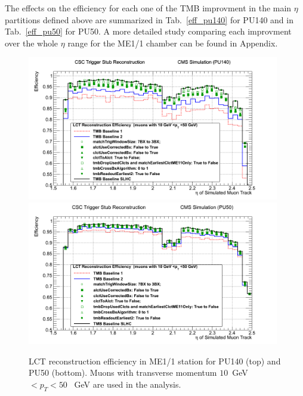 The effects on the efficiency for each one of the TMB improvment in the main $\eta$ partitions defined above are summarized in Tab.~\ref{eff_pu140} for PU140 and in Tab.~\ref{eff_pu50} for PU50. A more detailed study comparing each improvment over the whole $\eta$ range for the ME1/1 chamber can be found in Appendix.

\begin{figure}[p]
\includegraphics[width=0.98\textwidth]{figures/TMB_improvements_LCT_recoEff.png}
\includegraphics[width=0.98\textwidth]{figures/TMB_improvements_LCT_recoEff_PU50.png}
\caption{LCT reconstruction efficiency in ME1/1 station for PU140 (top) and PU50 (bottom). Muons with transverse momentum $10$~GeV$<p_T<50$~ GeV are used in the analysis.}
\label{fig:TMB_improvements_LCT_recoEff}
\end{figure}


